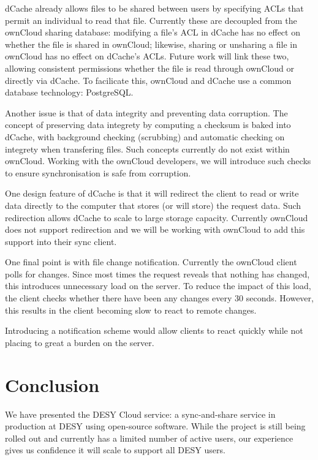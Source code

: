 \documentclass[a4paper]{jpconf}
\begin{document}
dCache already allows files to be shared between users by specifying
ACLs that permit an individual to read that file.  Currently these are
decoupled from the ownCloud sharing database: modifying a file's ACL
in dCache has no effect on whether the file is shared in ownCloud;
likewise, sharing or unsharing a file in ownCloud has no effect on
dCache's ACLs.  Future work will link these two, allowing consistent
permissions whether the file is read through ownCloud or directly via
dCache.  To facilicate this, ownCloud and dCache use a common database
technology: PostgreSQL.

Another issue is that of data integrity and preventing data
corruption.  The concept of preserving data integrety by computing a
checksum is baked into dCache, with background checking (scrubbing)
and automatic checking on integrety when transfering files.  Such
concepts currently do not exist within ownCloud.  Working with the
ownCloud developers, we will introduce such checks to ensure
synchronisation is safe from corruption.

One design feature of dCache is that it will redirect the client to
read or write data directly to the computer that stores (or will
store) the request data.  Such redirection allows dCache to scale to
large storage capacity.  Currently ownCloud does not support
redirection and we will be working with ownCloud to add this support
into their sync client.

One final point is with file change notification.  Currently the
ownCloud client polls for changes.  Since most times the request
reveals that nothing has changed, this introduces unnecessary load on
the server.  To reduce the impact of this load, the client checks
whether there have been any changes every 30 seconds.  However, this
results in the client becoming slow to react to remote changes.

Introducing a notification scheme would allow clients to react quickly
while not placing to great a burden on the server.

\section{Conclusion}

We have presented the DESY Cloud service: a sync-and-share service in
production at DESY using open-source software.  While the project is
still being rolled out and currently has a limited number of active
users, our experience gives us confidence it will scale to support all
DESY users.
\end{document}

